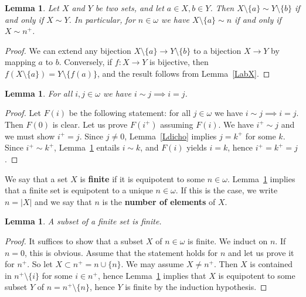 \documentclass[12pt,letterpaper]{article}
\newtheorem{lem}[thm]{Lemma} %
\begin{document}
\begin{lem}\label{LabXY} 
Let \(X\) and \(Y\) be two sets, and let \(a\in X,b\in Y\). Then \(X\setminus\{a\}\sim Y\setminus\{b\}\) if and only if \(X\sim Y\). In particular, for \(n\in\omega\) we have \(X\setminus\{a\}\sim n\) if and only if \(X\sim n^+\).
\end{lem} 
\begin{proof} 
We can extend any bijection \(X\setminus\{a\}\to Y\setminus\{b\}\) to a bijection \(X\to Y\) by mapping \(a\) to \(b\). Conversely, if \(f:X\to Y\) is bijective, then \(f(X\setminus\{a\})=Y\setminus\{f(a)\}\), and the result follows from Lemma~\ref{LabX}. 
\end{proof} 

\begin{lem}\label{Lbasic} 
For all \(i,j\in\omega\) we have \(i\sim j\implies i=j\). 
\end{lem} 
\begin{proof} 
Let \(F(i)\) be the following statement: for all \(j\in\omega\) we have \(i\sim j\implies i=j\). Then \(F(0)\) is clear. Let us prove \(F(i^+)\) assuming \(F(i)\). We have \(i^+\sim j\) and we must show \(i^+=j\). Since \(j\ne0\), Lemma~\ref{Ldicho} implies \(j=k^+\) for some \(k\). Since \(i^+\sim k^+\), Lemma~\ref{LabXY} entails \(i\sim k\), and \(F(i)\) yields \(i=k\), hence \(i^+=k^+=j\). 
\end{proof} 

We say that a set \(X\) is \textbf{finite} if it is equipotent to some \(n\in\omega\). Lemma~\ref{Lbasic} implies that a finite set is equipotent to a unique \(n\in\omega\). If this is the case, we write \(n=|X|\) and we say that \(n\) is the \textbf{number of elements} of \(X\). 

\begin{lem}\label{Lsubset} 
A subset of a finite set is finite. 
\end{lem} 
\begin{proof} 
It suffices to show that a subset \(X\) of \(n\in\omega\) is finite. We induct on \(n\). If \(n=0\), this is obvious. Assume that the statement holds for \(n\) and let us prove it for \(n^+\). So let \(X\subset n^+=n\cup\{n\}\). We may assume \(X\ne n^+\). Then \(X\) is contained in \(n^+\setminus\{i\}\) for some \(i\in n^+\), hence Lemma~\ref{LabXY} implies that \(X\) is equipotent to some subset \(Y\) of \(n=n^+\setminus\{n\}\), hence \(Y\) is finite by the induction hypothesis. 
\end{proof} 
\end{document}
